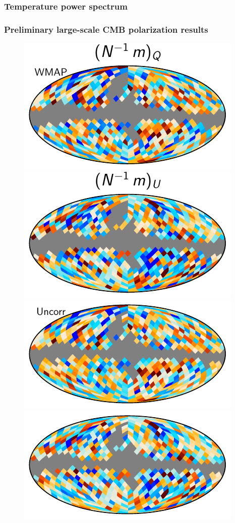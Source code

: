\documentclass[twocolumn]{../../common/aa}
\begin{document}
\subsubsection{Temperature power spectrum}
\label{sec:cls}

\subsubsection{Preliminary large-scale CMB polarization results}
\label{sec:lowl_cmb}


\begin{figure}[t]
  \centering
        \includegraphics[width=0.49\linewidth]{figures/wtr39yrKaQVmapq.pdf}
        \includegraphics[width=0.49\linewidth]{figures/wtr39yrKaQVmapu.pdf}\\
        \includegraphics[width=0.49\linewidth]{figures/wmap_reprod_KaQV_9yr_q_scale.pdf}
        \includegraphics[width=0.49\linewidth]{figures/wmap_reprod_KaQV_9yr_u_scale.pdf}\\

\end{figure}
\end{document}
